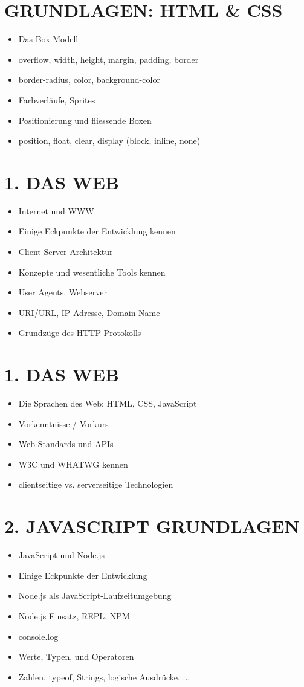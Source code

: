 \documentclass[10pt]{article}
\begin{document}
\section*{GRUNDLAGEN: HTML \& CSS}
\begin{itemize}
  \item Das Box-Modell
  \item overflow, width, height, margin, padding, border
  \item border-radius, color, background-color
  \item Farbverläufe, Sprites
  \item Positionierung und fliessende Boxen
  \item position, float, clear, display (block, inline, none)
\end{itemize}

\section*{1. DAS WEB}
\begin{itemize}
  \item Internet und WWW
  \item Einige Eckpunkte der Entwicklung kennen
  \item Client-Server-Architektur
  \item Konzepte und wesentliche Tools kennen
  \item User Agents, Webserver
  \item URI/URL, IP-Adresse, Domain-Name
  \item Grundzüge des HTTP-Protokolls
\end{itemize}

\section*{1. DAS WEB}
\begin{itemize}
  \item Die Sprachen des Web: HTML, CSS, JavaScript
  \item Vorkenntnisse / Vorkurs
  \item Web-Standards und APIs
  \item W3C und WHATWG kennen
  \item clientseitige vs. serverseitige Technologien
\end{itemize}

\section*{2. JAVASCRIPT GRUNDLAGEN}
\begin{itemize}
  \item JavaScript und Node.js
  \item Einige Eckpunkte der Entwicklung
  \item Node.js als JavaScript-Laufzeitumgebung
  \item Node.js Einsatz, REPL, NPM
  \item console.log
  \item Werte, Typen, und Operatoren
  \item Zahlen, typeof, Strings, logische Ausdrücke, ...
\end{itemize}
\end{document}
